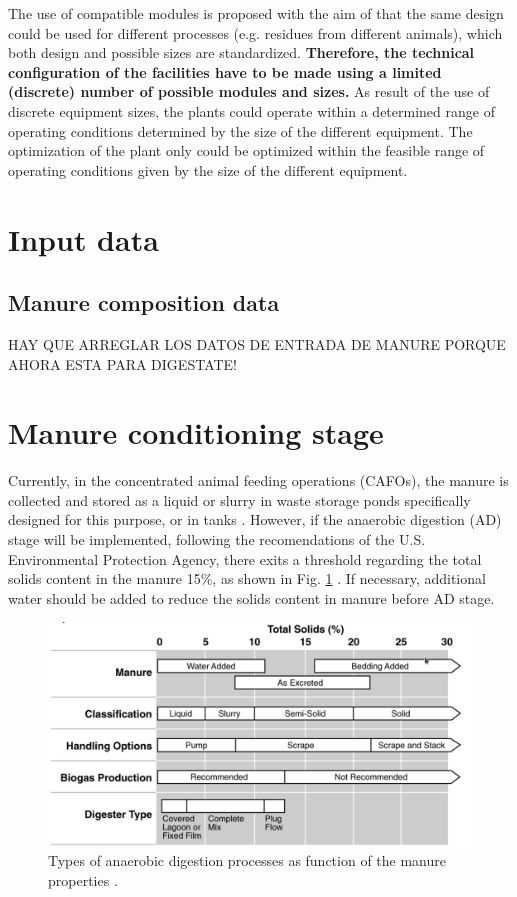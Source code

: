 \documentclass[10pt,a4paper]{article}
\begin{document}
The use of compatible modules is proposed with the aim of that the same design could be used for different processes (e.g. residues from different animals), which both design and possible sizes are standardized. \textbf{Therefore, the technical configuration of the facilities have to be made using a limited (discrete) number of possible modules and sizes.} As result of the use of discrete equipment sizes, the plants could operate within a determined range of operating conditions determined by the size of the different equipment. The optimization of the plant only could be optimized within the feasible range of operating conditions given by the size of the different equipment.

\section{Input data}
\subsection{Manure composition data}
HAY QUE ARREGLAR LOS DATOS DE ENTRADA DE MANURE PORQUE AHORA ESTA PARA DIGESTATE!

\section{Manure conditioning stage}
Currently, in the concentrated animal feeding operations (CAFOs), the manure is collected and stored as a liquid or slurry in waste storage ponds specifically designed for this purpose, or in tanks \cite{USDAHandbook}. However, if the anaerobic digestion (AD) stage will be implemented, following the recomendations of the U.S. Environmental Protection Agency, there exits a threshold regarding the total solids content in the manure 15\%, as shown in Fig. \ref{fig:TS_max} \cite{AgSTARHandbook}. If necessary, additional water should be added to reduce the solids content in manure before AD stage.

\begin{figure}[H]
	\centering
	\includegraphics[width=0.6\linewidth]{TS_max} 
	\caption{Types of anaerobic digestion processes as function of the manure properties \cite{AgSTARHandbook}.}
	\label{fig:TS_max}
\end{figure}
\end{document}
